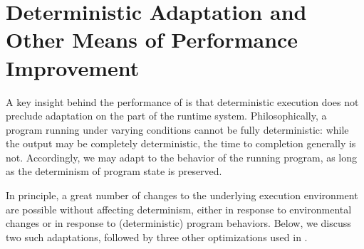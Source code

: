 \section{Deterministic Adaptation and Other Means of Performance Improvement}
\label{s:optimizations}

A key insight behind the performance of \lib{} is that deterministic execution does not preclude adaptation on the part of the runtime system. 
Philosophically, a program running under varying conditions cannot be fully deterministic: while the output may be completely deterministic, the time to completion generally is not.
Accordingly, we may adapt to the behavior of the running program, as long as the determinism of program state is preserved. 

In principle, a great number of changes to the underlying execution environment are possible without affecting determinism, either in response to environmental changes or in response to (deterministic) program behaviors. Below, we discuss two such adaptations, followed by three other optimizations used in \lib{}.

%
%
%


